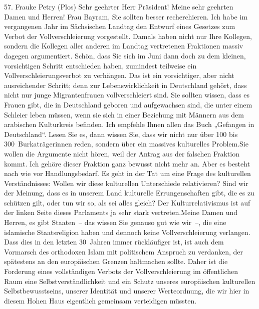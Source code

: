 \documentclass{article}
\begin{document}
	57. Frauke Petry (Plos) Sehr geehrter Herr Präsident! Meine sehr geehrten Damen und Herren! Frau Bayram, Sie sollten besser recherchieren. Ich habe im vergangenen Jahr im Sächsischen Landtag den Entwurf eines Gesetzes zum Verbot der Vollverschleierung vorgestellt. Damals haben nicht nur Ihre Kollegen, sondern die Kollegen aller anderen im Landtag vertretenen Fraktionen massiv dagegen argumentiert. Schön, dass Sie sich im Juni dann doch zu dem kleinen, vorsichtigen Schritt entschieden haben, zumindest teilweise ein Vollverschleierungsverbot zu verhängen. Das ist ein vorsichtiger, aber nicht ausreichender Schritt; denn zur Lebenswirklichkeit in Deutschland gehört, dass nicht nur junge Migrantenfrauen vollverschleiert sind. Sie sollten wissen, dass es Frauen gibt, die in Deutschland geboren und aufgewachsen sind, die unter einem Schleier leben müssen, wenn sie sich in einer Beziehung mit Männern aus dem arabischen Kulturkreis befinden. Ich empfehle Ihnen allen das Buch „Gefangen in Deutschland“. Lesen Sie es, dann wissen Sie, dass wir nicht nur über 100 bis 300 Burkaträgerinnen reden, sondern über ein massives kulturelles Problem.Sie wollen die Argumente nicht hören, weil der Antrag aus der falschen Fraktion kommt. Ich gehöre dieser Fraktion ganz bewusst nicht mehr an. Aber es besteht nach wie vor Handlungsbedarf. Es geht in der Tat um eine Frage des kulturellen Verständnisses: Wollen wir diese kulturellen Unterschiede relativieren? Sind wir der Meinung, dass es in unserem Land kulturelle Errungenschaften gibt, die es zu schützen gilt, oder tun wir so, als sei alles gleich? Der Kulturrelativismus ist auf der linken Seite dieses Parlaments ja sehr stark vertreten.Meine Damen und Herren, es gibt Staaten – das wissen Sie genauso gut wie wir –, die eine islamische Staatsreligion haben und dennoch keine Vollverschleierung verlangen. Dass dies in den letzten 30 Jahren immer rückläufiger ist, ist auch dem Vormarsch des orthodoxen Islam mit politischem Anspruch zu verdanken, der spätestens an den europäischen Grenzen haltmachen sollte. Daher ist die Forderung eines vollständigen Verbots der Vollverschleierung im öffentlichen Raum eine Selbstverständlichkeit und ein Schutz unseres europäischen kulturellen Selbstbewusstseins, unserer Identität und unserer Werteordnung, die wir hier in diesem Hohen Haus eigentlich gemeinsam verteidigen müssten.
\end{document}
